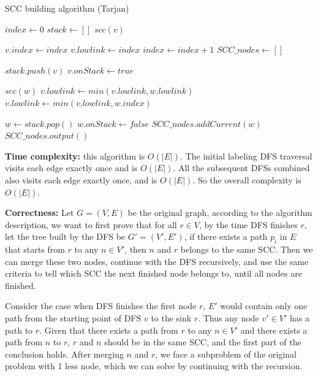 \documentclass{article}
\begin{document}
\begin{description}
  \begin{algorithm}[H]
  \caption{SCC building algorithm (Tarjan)}
  \label{alg:scc-graph}
    \begin{algorithmic}[1]
      \State $index \gets 0$
      \State $stack \gets []$
          \State $scc(v)$
        \EndIf
      \EndFor

        \State $v.index \gets index$
        \State $v.lowlink \gets index$
        \State $index \gets index + 1$
        \State $SCC\_nodes \gets []$

        \State $stack.push(v)$
        \State $v.onStack \gets true$

            \State $scc(w)$
            \State $v.lowlink \gets min(v.lowlink, w.lowlink)$
            \State $v.lowlink \gets min(v.lowlink, w.index)$
          \EndIf
        \EndFor

            \State $w \gets stack.pop()$
            \State $w.onStack \gets false$
            \State $SCC\_nodes.addCurrent(w)$
          \EndWhile
        \EndIf
        \State $SCC\_nodes.output()$
        \label{line:output}
      \EndFunction

    \EndFunction

    \end{algorithmic}
  \end{algorithm}

  \textbf{Time complexity:} this algorithm is $O(|E|)$. The initial labeling DFS traversal visits each edge exactly once and is $O(|E|)$. All the subsequent DFSs combined also visits each edge exactly once, and is $O(|E|)$. So the overall complexity is $O(|E|)$.

  \textbf{Correctness:} Let $G=(V,E)$ be the original graph, according to the algorithm description, we want to first prove that for all $r \in V$, by the time DFS finishes $r$, let the tree built by the DFS be $G'=(V',E')$, if there exists a path $p_i$ in $E$ that starts from $r$ to any $n \in V'$, then $n$ and $r$ belongs to the same SCC. Then we can merge these two nodes, continue with the DFS recursively, and use the same criteria to tell which SCC the next finished node belongs to, until all nodes are finished. 

  Consider the case when DFS finishes the first node $r$, $E'$ would contain only one path from the starting point of DFS $v$ to the sink $r$. Thus any node $v' \in V'$ has a path to $r$. Given that there exists a path from $r$ to any $n \in V'$ and there exists a path from $n$ to $r$, $r$ and $n$ should be in the same SCC, and the first part of the conclusion holds. After merging $n$ and $r$, we face a subproblem of the original problem with 1 less node, which we can solve by continuing with the recursion. 


\end{description}
\end{document}
